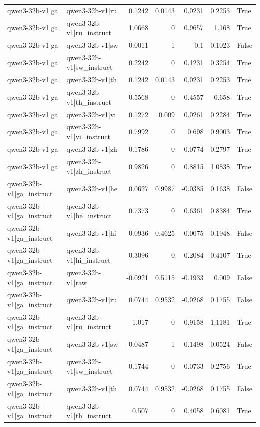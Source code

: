 \begin{table}
\begin{tabular}{l l r r r r l}
qwen3-32b-v1|ga & qwen3-32b-v1|ru & 0.1242 & 0.0143 & 0.0231 & 0.2253 & True \\
qwen3-32b-v1|ga & qwen3-32b-v1|ru_instruct & 1.0668 & 0 & 0.9657 & 1.168 & True \\
qwen3-32b-v1|ga & qwen3-32b-v1|sw & 0.0011 & 1 & -0.1 & 0.1023 & False \\
qwen3-32b-v1|ga & qwen3-32b-v1|sw_instruct & 0.2242 & 0 & 0.1231 & 0.3254 & True \\
qwen3-32b-v1|ga & qwen3-32b-v1|th & 0.1242 & 0.0143 & 0.0231 & 0.2253 & True \\
qwen3-32b-v1|ga & qwen3-32b-v1|th_instruct & 0.5568 & 0 & 0.4557 & 0.658 & True \\
qwen3-32b-v1|ga & qwen3-32b-v1|vi & 0.1272 & 0.009 & 0.0261 & 0.2284 & True \\
qwen3-32b-v1|ga & qwen3-32b-v1|vi_instruct & 0.7992 & 0 & 0.698 & 0.9003 & True \\
qwen3-32b-v1|ga & qwen3-32b-v1|zh & 0.1786 & 0 & 0.0774 & 0.2797 & True \\
qwen3-32b-v1|ga & qwen3-32b-v1|zh_instruct & 0.9826 & 0 & 0.8815 & 1.0838 & True \\
qwen3-32b-v1|ga_instruct & qwen3-32b-v1|he & 0.0627 & 0.9987 & -0.0385 & 0.1638 & False \\
qwen3-32b-v1|ga_instruct & qwen3-32b-v1|he_instruct & 0.7373 & 0 & 0.6361 & 0.8384 & True \\
qwen3-32b-v1|ga_instruct & qwen3-32b-v1|hi & 0.0936 & 0.4625 & -0.0075 & 0.1948 & False \\
qwen3-32b-v1|ga_instruct & qwen3-32b-v1|hi_instruct & 0.3096 & 0 & 0.2084 & 0.4107 & True \\
qwen3-32b-v1|ga_instruct & qwen3-32b-v1|raw & -0.0921 & 0.5115 & -0.1933 & 0.009 & False \\
qwen3-32b-v1|ga_instruct & qwen3-32b-v1|ru & 0.0744 & 0.9532 & -0.0268 & 0.1755 & False \\
qwen3-32b-v1|ga_instruct & qwen3-32b-v1|ru_instruct & 1.017 & 0 & 0.9158 & 1.1181 & True \\
qwen3-32b-v1|ga_instruct & qwen3-32b-v1|sw & -0.0487 & 1 & -0.1498 & 0.0524 & False \\
qwen3-32b-v1|ga_instruct & qwen3-32b-v1|sw_instruct & 0.1744 & 0 & 0.0733 & 0.2756 & True \\
qwen3-32b-v1|ga_instruct & qwen3-32b-v1|th & 0.0744 & 0.9532 & -0.0268 & 0.1755 & False \\
qwen3-32b-v1|ga_instruct & qwen3-32b-v1|th_instruct & 0.507 & 0 & 0.4058 & 0.6081 & True \\

\end{tabular}
\end{table}
